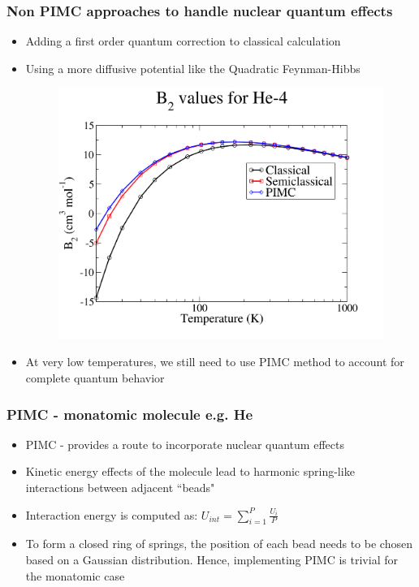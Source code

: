 \documentclass[xcolor=svgnames]{beamer}
\begin{document}
	\begin{frame}
	\frametitle{Non PIMC approaches to handle nuclear quantum effects}
	\begin{itemize}
	\justifying
	\item Adding a first order quantum correction to classical calculation
	\item Using a more diffusive potential like the Quadratic Feynman-Hibbs
	\begin{figure}
	\centering
	\includegraphics[scale=0.03,keepaspectratio]{B2-Kate.png}
	\end{figure}
	\item At very low temperatures, we still need to use PIMC method to account for complete quantum behavior
	\end{itemize}
	\end{frame}

	\begin{frame}
	\frametitle{PIMC - monatomic molecule e.g. He}
	\begin{itemize}
	\justifying
	\item PIMC - provides a route to incorporate nuclear quantum effects
	\item Kinetic energy effects of the molecule lead to harmonic spring-like interactions between adjacent ``beads"
	\begin{figure}          
	\centering
	\def\svgscale{0.3}
	
	\end{figure}
	\item Interaction energy is computed as: $U_{int} = \displaystyle\sum\limits_{i=1}^P \frac{U_i}{P}$
	\begin{figure}
	\centering
	\def\svgscale{0.3}
	
	\end{figure}
	\item To form a closed ring of springs, the position of each bead needs to be chosen based on a Gaussian distribution. Hence, implementing PIMC is trivial for the monatomic case
	\end{itemize}
	\end{frame}
	
\end{document}
